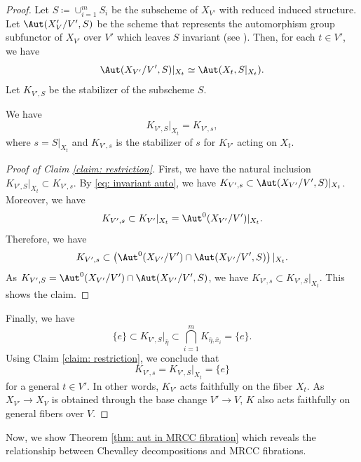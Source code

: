 \documentclass[11pt]{amsart}
\begin{document}
\begin{proof}
Let $S \coloneqq \cup_{i=1}^m S_i$ be the subscheme of $X_{V'}$ with reduced induced structure. Let $\Aut(X_V'/V', S)$ be the scheme that represents the automorphism group subfunctor of $X_{V'}$ over $V'$ which leaves $S$ invariant (see \cite[\S 2]{Xu20}). Then, for each $t\in V'$, we have
\begin{equation}\label{eq: invariant auto}
\Aut(X_{V'}/V', S)|_{X_t} \simeq \Aut(X_t, S|_{X_t}).
\end{equation} Let $K_{V', S}$ be the stabilizer of the subscheme $S$. 

\begin{claim}\label{claim: restriction}
We have
\[
K_{V', S}|_{X_t} = K_{V', s},
\] where $s= S|_{X_t}$ and $K_{V', s}$ is the stabilizer of $s$ for $K_{V'}$ acting on $X_t$.
\end{claim}
\begin{proof}[{Proof of Claim \ref{claim: restriction}}]
First, we have the natural inclusion $K_{V', S}|_{X_t} \subset K_{V', s}$. By \eqref{eq: invariant auto}, we have $K_{V', s}  \subset \Aut(X_{V'}/V', S)|_{X_t}$. Moreover, we have
\[
K_{V', s}  \subset K_{V'}|_{X_t} = \Aut^0(X_{V'}/V')|_{X_t} .
\] Therefore, we have
\[
K_{V', s}  \subset \left(\Aut^0(X_{V'}/V') \cap \Aut(X_{V'}/V', S)\right)|_{X_t}. 
\] As $K_{V', S} = \Aut^0(X_{V'}/V') \cap \Aut(X_{V'}/V', S)$, we have $K_{V', s} \subset K_{V', S}|_{X_t}$. This shows the claim.
\end{proof}

Finally, we have   
\[
\{e\} \subset K_{V', S}|_{\bar\eta} \subset \bigcap_{i=1}^m K_{\bar\eta, \bar x_i} = \{e\}.
\]  
Using Claim \ref{claim: restriction}, we conclude that  
\[
K_{V', s} = K_{V', S}|_{X_t} = \{e\}
\]  
for a general \( t \in V' \). In other words, $K_{V'}$ acts faithfully on the fiber $X_t$. As $X_{V'} \to X_V$ is obtained through the base change $V' \to V$, $K$ also acts faithfully on general fibers over $V$.
\end{proof}

Now, we show Theorem \ref{thm: aut in MRCC fibration} which reveals the relationship between Chevalley decompositions and MRCC fibrations.
\end{document}

